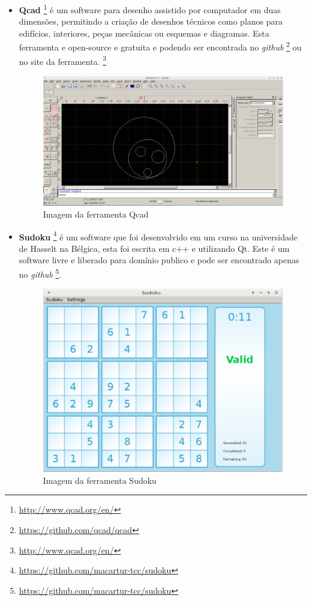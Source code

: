 \begin{itemize}
    \item \textbf{Qcad}
\footnote{\url{http://www.qcad.org/en/}} é um software para desenho
 assistido por computador em duas dimensões, permitindo a criação de desenhos técnicos como
 planos para edifícios, interiores, peças mecânicas ou esquemas e diagramas. Esta ferramenta
 e open-source  e gratuita e podendo ser encontrada no \textit{github}
\footnote{\url{https://github.com/qcad/qcad}} ou no site da ferramenta.
\footnote{\url{http://www.qcad.org/en/}}

    \begin{figure}[h]
        \centering
            \includegraphics[scale=0.3]{figuras/qcad.eps}
        \caption{Imagem da ferramenta Qcad}
        \label{ferramenta_qcad}
    \end{figure}

    \item \textbf{Sudoku}
\footnote{\url{https://github.com/macartur-tcc/sudoku}} é um software que foi
 desenvolvido em um curso na universidade de Hasselt na Bélgica, esta foi escrita em c++ e utilizando Qt.
 Este é um software livre e liberado para domínio publico e pode ser encontrado apenas no \textit{github}
\footnote{\url{https://github.com/macartur-tcc/sudoku}}.

    \begin{figure}[h]
        \centering
            \includegraphics[scale=0.3]{figuras/sudoku.eps}
        \caption{Imagem da ferramenta Sudoku}
        \label{ferramenta_qcad}
    \end{figure}


\end{itemize}
